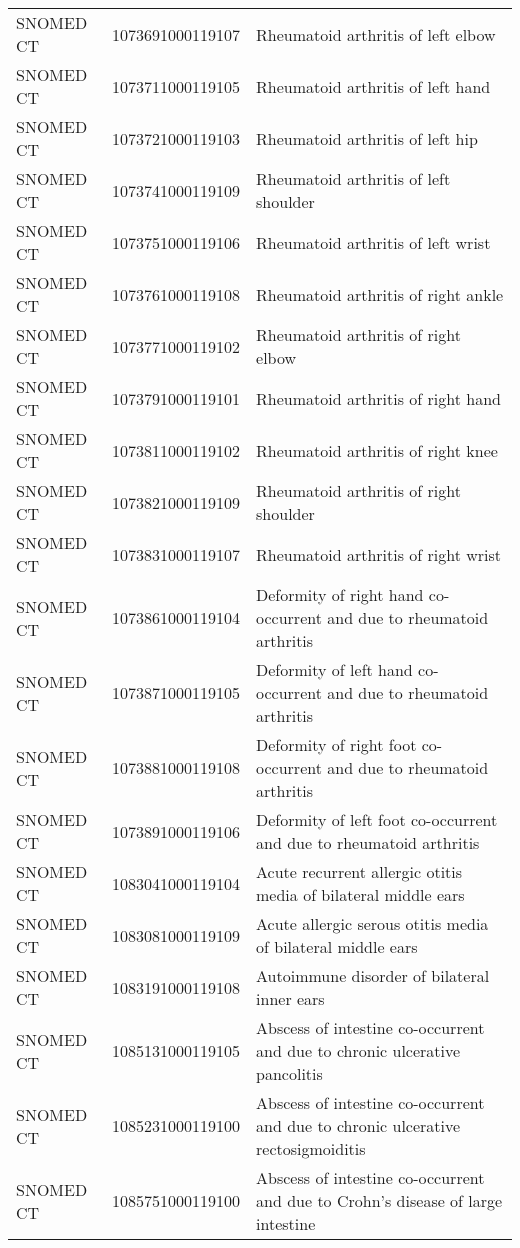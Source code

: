 \begin{longtable}{p{}p{}p{}}
  SNOMED CT & 1073691000119107 & Rheumatoid arthritis of left elbow \\ 
  SNOMED CT & 1073711000119105 & Rheumatoid arthritis of left hand \\ 
  SNOMED CT & 1073721000119103 & Rheumatoid arthritis of left hip \\ 
  SNOMED CT & 1073741000119109 & Rheumatoid arthritis of left shoulder \\ 
  SNOMED CT & 1073751000119106 & Rheumatoid arthritis of left wrist \\ 
  SNOMED CT & 1073761000119108 & Rheumatoid arthritis of right ankle \\ 
  SNOMED CT & 1073771000119102 & Rheumatoid arthritis of right elbow \\ 
  SNOMED CT & 1073791000119101 & Rheumatoid arthritis of right hand \\ 
  SNOMED CT & 1073811000119102 & Rheumatoid arthritis of right knee \\ 
  SNOMED CT & 1073821000119109 & Rheumatoid arthritis of right shoulder \\ 
  SNOMED CT & 1073831000119107 & Rheumatoid arthritis of right wrist \\ 
  SNOMED CT & 1073861000119104 & Deformity of right hand co-occurrent and due to rheumatoid arthritis \\ 
  SNOMED CT & 1073871000119105 & Deformity of left hand co-occurrent and due to rheumatoid arthritis \\ 
  SNOMED CT & 1073881000119108 & Deformity of right foot co-occurrent and due to rheumatoid arthritis \\ 
  SNOMED CT & 1073891000119106 & Deformity of left foot co-occurrent and due to rheumatoid arthritis \\ 
  SNOMED CT & 1083041000119104 & Acute recurrent allergic otitis media of bilateral middle ears \\ 
  SNOMED CT & 1083081000119109 & Acute allergic serous otitis media of bilateral middle ears \\ 
  SNOMED CT & 1083191000119108 & Autoimmune disorder of bilateral inner ears \\ 
  SNOMED CT & 1085131000119105 & Abscess of intestine co-occurrent and due to chronic ulcerative pancolitis \\ 
  SNOMED CT & 1085231000119100 & Abscess of intestine co-occurrent and due to chronic ulcerative rectosigmoiditis \\ 
  SNOMED CT & 1085751000119100 & Abscess of intestine co-occurrent and due to Crohn's disease of large intestine \\ 

\end{longtable}
